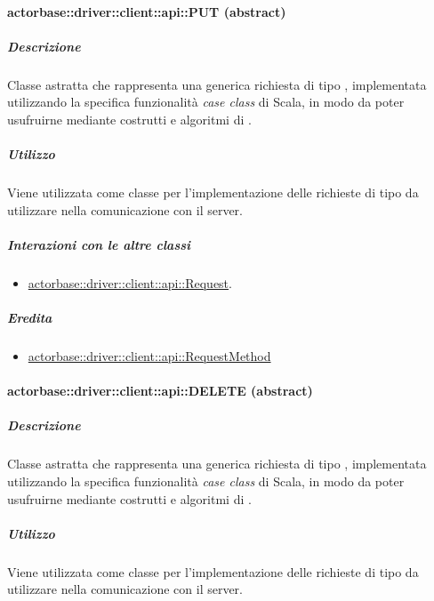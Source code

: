 \documentclass{scalatekids-article}
\begin{document}

\paragraph{actorbase::driver::client::api::PUT (abstract)}
\label{sec:actorbase::driver::client::api::PUT}

\subparagraph{Descrizione}

Classe astratta che rappresenta una generica richiesta  di tipo
, implementata utilizzando la specifica funzionalità \textit{case
  class} di Scala, in modo da poter usufruirne mediante costrutti e algoritmi di
.

\subparagraph{Utilizzo}

Viene utilizzata come classe per l'implementazione delle richieste 
di tipo  da utilizzare nella comunicazione con il server.

\subparagraph{Interazioni con le altre classi}

\begin{itemize}
\item \hyperref[sec:actorbase::driver::client::api::Request]{actorbase::driver::client::api::Request}.
\end{itemize}

\subparagraph{Eredita}

\begin{itemize}
\item \hyperref[sec:actorbase::driver::client::api::RequestMethod]{actorbase::driver::client::api::RequestMethod}
\end{itemize}


\paragraph{actorbase::driver::client::api::DELETE (abstract)}
\label{sec:actorbase::driver::client::api::DELETE}

\subparagraph{Descrizione}

Classe astratta che rappresenta una generica richiesta  di tipo
, implementata utilizzando la specifica funzionalità \textit{case
  class} di Scala, in modo da poter usufruirne mediante costrutti e algoritmi di
.

\subparagraph{Utilizzo}

Viene utilizzata come classe per l'implementazione delle richieste 
di tipo  da utilizzare nella comunicazione con il server.
\end{document}
